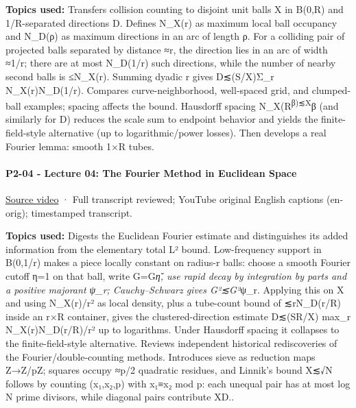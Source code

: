 \textbf{Topics used:} Transfers collision counting to disjoint unit balls X in B(0,R) and 1/R-separated directions D. Defines N\_X(r) as maximum local ball occupancy and N\_D(ρ) as maximum directions in an arc of length ρ. For a colliding pair of projected balls separated by distance ≈r, the direction lies in an arc of width ≈1/r; there are at most N\_D(1/r) such directions, while the number of nearby second balls is ≤N\_X(r). Summing dyadic r gives \textbar D\textbar≲(S/\textbar X\textbar)Σ\_r N\_X(r)N\_D(1/r). Compares curve-neighborhood, well-spaced grid, and clumped-ball examples; spacing affects the bound. Hausdorff spacing N\_X(R\textsuperscript{β)≲\textbar X\textbar{}}β (and similarly for D) reduces the scale sum to endpoint behavior and yields the finite-field-style alternative (up to logarithmic/power losses). Then develops a real Fourier lemma: smooth 1×R tubes.

\paragraph{P2-04 - Lecture 04: The Fourier Method in Euclidean Space}\label{p2-04---lecture-04-the-fourier-method-in-euclidean-space}

\href{https://www.youtube.com/watch?v=X-4how4KkPQ}{Source video} · Full transcript reviewed; YouTube original English captions (en-orig); timestamped transcript.

\textbf{Topics used:} Digests the Euclidean Fourier estimate and distinguishes its added information from the elementary total L² bound. Low-frequency support in B(0,1/r) makes a piece locally constant on radius-r balls: choose a smooth Fourier cutoff η=1 on that ball, write G=G\emph{η̌, use rapid decay by integration by parts and a positive majorant ψ\_r; Cauchy--Schwarz gives \textbar G\textbar²≲\textbar G\textbar²}ψ\_r. Applying this on X and using N\_X(r)/r² as local density, plus a tube-count bound of ≲rN\_D(r/R) inside an r×R container, gives the clustered-direction estimate \textbar D\textbar≲(SR/\textbar X\textbar) max\_r N\_X(r)N\_D(r/R)/r² up to logarithms. Under Hausdorff spacing it collapses to the finite-field-style alternative. Reviews independent historical rediscoveries of the Fourier/double-counting methods. Introduces sieve as reduction maps Z→Z/pZ; squares occupy ≈p/2 quadratic residues, and Linnik's bound \textbar X\textbar≲√N follows by counting (x₁,x₂,p) with x₁≡x₂ mod p: each unequal pair has at most log N prime divisors, while diagonal pairs contribute \textbar X\textbar\textbar D\textbar..


